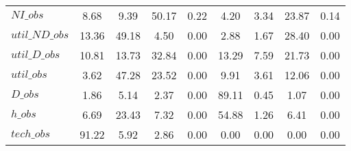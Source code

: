 \begin{center}
\begin{longtable}{lcccccccc}
$NI\_obs        $	 & 	         8.68	 & 	         9.39	 & 	        50.17	 & 	         0.22	 & 	         4.20	 & 	         3.34	 & 	        23.87	 & 	         0.14 \\ 
$util\_ND\_obs  $	 & 	        13.36	 & 	        49.18	 & 	         4.50	 & 	         0.00	 & 	         2.88	 & 	         1.67	 & 	        28.40	 & 	         0.00 \\ 
$util\_D\_obs   $	 & 	        10.81	 & 	        13.73	 & 	        32.84	 & 	         0.00	 & 	        13.29	 & 	         7.59	 & 	        21.73	 & 	         0.00 \\ 
$util\_obs      $	 & 	         3.62	 & 	        47.28	 & 	        23.52	 & 	         0.00	 & 	         9.91	 & 	         3.61	 & 	        12.06	 & 	         0.00 \\ 
$D\_obs         $	 & 	         1.86	 & 	         5.14	 & 	         2.37	 & 	         0.00	 & 	        89.11	 & 	         0.45	 & 	         1.07	 & 	         0.00 \\ 
$h\_obs         $	 & 	         6.69	 & 	        23.43	 & 	         7.32	 & 	         0.00	 & 	        54.88	 & 	         1.26	 & 	         6.41	 & 	         0.00 \\ 
$tech\_obs      $	 & 	        91.22	 & 	         5.92	 & 	         2.86	 & 	         0.00	 & 	         0.00	 & 	         0.00	 & 	         0.00	 & 	         0.00 \\ 
\end{longtable}
 \end{center}
